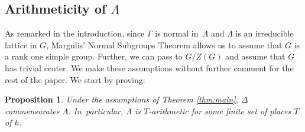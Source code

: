 \documentclass[JEP,XML,SOM,Unicode,published]{cedram}
\newtheorem{prop}[thm]{Proposition}
\theoremstyle{definition}
\begin{document}
\subsection{Arithmeticity of $\Lambda$}\label{sec:arithm}
As remarked in the introduction, since $\Gamma$ is normal in~$\Lambda$ and $\Lambda$ is an irreducible lattice in $G$, Margulis' Normal Subgroups Theorem allows us to assume that $G$ is a rank one simple group. Further, we can pass to $G/Z(G)$ and assume that $G$ has trivial center. We make these assumptions without further comment for the rest of the paper. We start by proving:
\begin{prop}\label{prop:Lambda-arithm}
Under the assumptions of Theorem \ref{thm:main}, $\Delta$ commensurates $\Lambda$. In~particular, $\Lambda$ is $T$-arithmetic for some finite set of places $T$ of $k$.
\end{prop}
\end{document}
